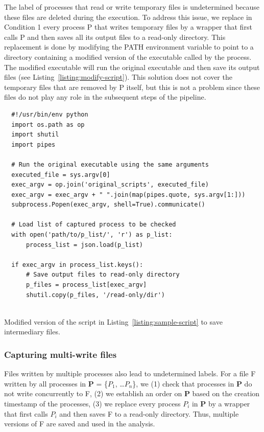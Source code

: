 \documentclass[a4paper,num-refs]{oup-contemporary}
\begin{document}
The label of processes that read or 
write temporary files is undetermined because these files are deleted during 
the execution. To address this issue, we replace in Condition 1 every process P that 
writes temporary files by a wrapper that first calls P and then
saves all its output files to a read-only directory. This replacement is
done by modifying the PATH environment variable to point to a directory
containing a modified version of the executable called by the process. The
modified executable will run the original executable and then save its
output files (see Listing~\ref{listing:modify-script}). 
This 
solution does not cover the temporary files that are removed by P 
itself, but this is not a problem since these files do not play any role in 
the subsequent steps of the pipeline. 

\begin{listing}
  \begin{verbatim}
  #!/usr/bin/env python
  import os.path as op
  import shutil
  import pipes

  # Run the original executable using the same arguments
  executed_file = sys.argv[0]
  exec_argv = op.join('original_scripts', executed_file)
  exec_argv = exec_argv + " ".join(map(pipes.quote, sys.argv[1:]))
  subprocess.Popen(exec_argv, shell=True).communicate()
  
  # Load list of captured process to be checked
  with open('path/to/p_list/', 'r') as p_list:
      process_list = json.load(p_list)

  if exec_argv in process_list.keys():
      # Save output files to read-only directory
      p_files = process_list[exec_argv]
      shutil.copy(p_files, '/read-only/dir')
  
  \end{verbatim}
    \caption{Modified version of the script in Listing~\ref{listing:sample-script} to save intermediary files.}
    \label{listing:modify-script}
  \end{listing}

\subsubsection{Capturing multi-write files}

Files written by multiple processes also lead 
to undetermined labels. For a file F 
written by all processes in \textbf{P} = \{$P_{1}$, \ldots $P_{n}$\}, we 
(1) check that processes in \textbf{P} do not write concurrently to F, 
(2) we establish an order on \textbf{P} based on the creation timestamp 
of the processes, (3) we replace every process $P_{i}$ in \textbf{P} by 
a wrapper that first calls $P_{i}$ and then saves F to a read-only 
directory. Thus, multiple versions of F are saved and used in the 
analysis. 
\end{document}
